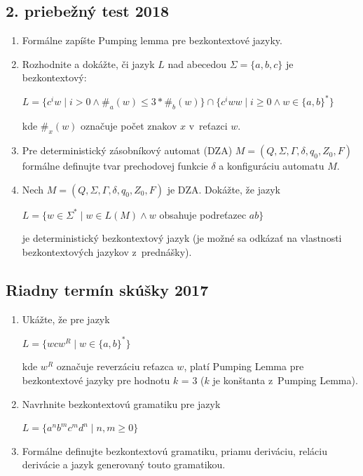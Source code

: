 \documentclass[11pt,a4paper]{article}
\begin{document}
		\subsection{2. priebežný test 2018}

		\begin{enumerate}
			\item Formálne zapíšte Pumping lemma pre bezkontextové jazyky.

			\item Rozhodnite a dokážte, či jazyk $L$ nad abecedou $\Sigma = \{a,b,c\}$ je bezkontextový:
	
			$L = \{c^iw \mid i > 0 \land \#_a(w) \leq 3 * \#_b(w)\} \cap \{c^iww \mid i \geq 0 \land w \in \{a,b\}^*\}$
	
			kde $\#_x(w)$ označuje počet znakov $x$ v~reťazci $w$.
	
			\item Pre deterministický zásobníkový automat (DZA) $M = (Q, \Sigma, \Gamma, \delta, q_0, Z_0, F)$ formálne definujte tvar prechodovej funkcie $\delta$ a konfiguráciu automatu $M$.
	
			\item Nech $M = (Q, \Sigma, \Gamma, \delta, q_0, Z_0, F)$ je DZA. Dokážte, že jazyk
	
			$L = \{w \in \Sigma^* \mid w \in L(M) \land w$ obsahuje podreťazec $ab\}$
	
			je deterministický bezkontextový jazyk (je možné sa odkázať na vlastnosti bezkontextových jazykov z~prednášky).
		\end{enumerate}

		\subsection{Riadny termín skúšky 2017}

		\begin{enumerate}
			\item Ukážte, že pre jazyk

			$L = \{wcw^R \mid w \in \{a,b\}^*\}$
	
			kde $w^R$ označuje reverzáciu reťazca $w$, platí Pumping Lemma pre bezkontextové jazyky pre hodnotu $k$ = 3 ($k$ je konštanta z~Pumping Lemma).
	
			\item Navrhnite bezkontextovú gramatiku pre jazyk
	
			$L = \{a^nb^mc^md^n \mid n,m \geq 0\}$
	
			\item Formálne definujte bezkontextovú gramatiku, priamu deriváciu, reláciu derivácie a jazyk generovaný touto gramatikou.
		\end{enumerate}
\end{document}
